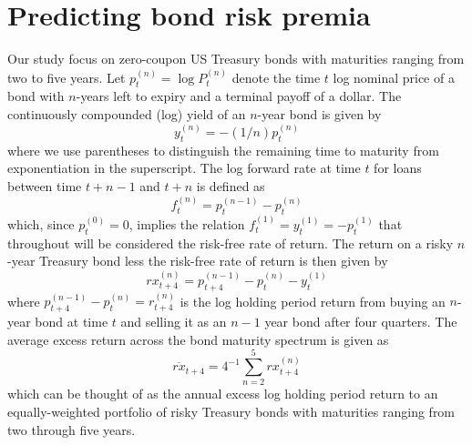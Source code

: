 \documentclass[12pt,letterpaper,leqno,doublespacing]{article}
\begin{document}

\section{Predicting bond risk premia}\label{Sec:e_predicting_brp}
Our study focus on zero-coupon US Treasury bonds with maturities ranging from two to five years. Let $p_{t}^{\left(n\right)} = \log P_{t}^{\left(n\right)}$ denote the time $t$ log nominal price of a bond with $n$-years left to expiry and a terminal payoff of a dollar. The continuously compounded (log) yield of an $n$-year bond is given by 
\begin{equation}
    y_{t}^{\left(n\right)} = -\left(1/n\right) p_{t}^{\left(n\right)}
    \label{eq:e_log_yield}
\end{equation}
where we use parentheses to distinguish the remaining time to maturity from exponentiation in the superscript. The log forward rate at time $t$ for loans between time $t+n-1$ and $t+n$ is defined as 
\begin{equation}
    f_{t}^{\left(n\right)} = p_{t}^{\left(n-1\right)} - p_{t}^{\left(n\right)}
    \label{eq:e_log_forwards} 
\end{equation}
which, since $p_{t}^{\left(0\right)} = 0$, implies the relation $f_{t}^{\left(1\right)} = y_{t}^{\left(1\right)} = -p_{t}^{\left(1\right)}$ that throughout will be considered the risk-free rate of return. The return on a risky $n$-year Treasury bond less the risk-free rate of return is then given by 
\begin{equation}
    rx_{t+4}^{\left(n\right)} = p_{t+4}^{\left(n-1\right)} - p_{t}^{\left(n\right)} - y_{t}^{\left(1\right)}
    \label{eq:e_risk_premia}
\end{equation}
where $p_{t+4}^{\left(n-1\right)} - p_{t}^{\left(n\right)} = r_{t+4}^{\left(n\right)}$ is the log holding period return from buying an $n$-year bond at time $t$ and selling it as an $n-1$ year bond after four quarters. The average excess return across the bond maturity spectrum is given as 
\begin{equation}
    \overline{rx}_{t+4} = 4^{-1} \sum_{n=2}^{5} rx_{t+4}^{\left(n\right)}
    \label{eq:e_rxbar}
\end{equation}
which can be thought of as the annual excess log holding period return to an equally-weighted portfolio of risky Treasury bonds with maturities ranging from two through five years. 
\end{document}
